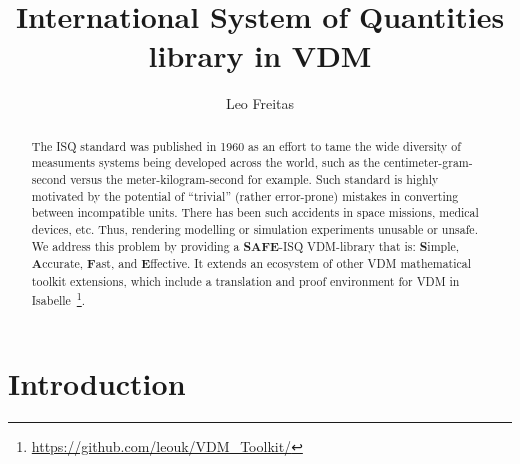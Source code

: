 \documentclass[runningheads,a4paper]{llncs}
\begin{document}
%



\title{International System of Quantities library in VDM}

\author{Leo Freitas
}
\authorrunning{ }

			
\maketitle
\setcounter{footnote}{0} 
\begin{abstract}
    The \gls{ISQ} standard was published in 1960 as an effort to tame the wide diversity of measuments systems being developed across the world, such as the centimeter-gram-second versus the meter-kilogram-second for example. Such standard is highly motivated by the potential of ``trivial'' (rather error-prone) mistakes in converting between incompatible units. There has been such accidents in space missions, medical devices, etc. Thus, rendering modelling or simulation experiments unusable or unsafe. We address this problem by providing a \textbf{SAFE}-ISQ VDM-library that is: \textbf{S}imple, \textbf{A}ccurate, \textbf{F}ast, and \textbf{E}ffective. It extends an ecosystem of other VDM mathematical toolkit extensions, which include a translation and proof environment for VDM in Isabelle~\footnote{\url{https://github.com/leouk/VDM_Toolkit/}}.
\end{abstract}


\section{Introduction}\label{sec:intro}
\end{document}
